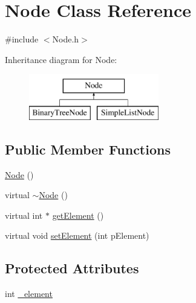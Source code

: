 \hypertarget{class_node}{\section{Node Class Reference}
\label{class_node}
}


{\ttfamily \#include $<$Node.\-h$>$}

Inheritance diagram for Node\-:\begin{figure}[H]
\begin{center}
\leavevmode
\includegraphics[height=2.000000cm]{class_node}
\end{center}
\end{figure}
\subsection*{Public Member Functions}
\begin{DoxyCompactItemize}
\item 
\hyperlink{class_node_ad7a34779cad45d997bfd6d3d8043c75f}{Node} ()
\item 
virtual \hyperlink{class_node_aa0840c3cb5c7159be6d992adecd2097c}{$\sim$\-Node} ()
\item 
virtual int $\ast$ \hyperlink{class_node_a1c8daccb897d8e66ae5cbf876c2fa6e6}{get\-Element} ()
\item 
virtual void \hyperlink{class_node_a8b0a97a06dad1f4c250e565a81618e26}{set\-Element} (int p\-Element)
\end{DoxyCompactItemize}
\subsection*{Protected Attributes}
\begin{DoxyCompactItemize}
\item 
int \hyperlink{class_node_a99b26594c7b3c736b2356f5933ec88b5}{\-\_\-element}
\end{DoxyCompactItemize}


